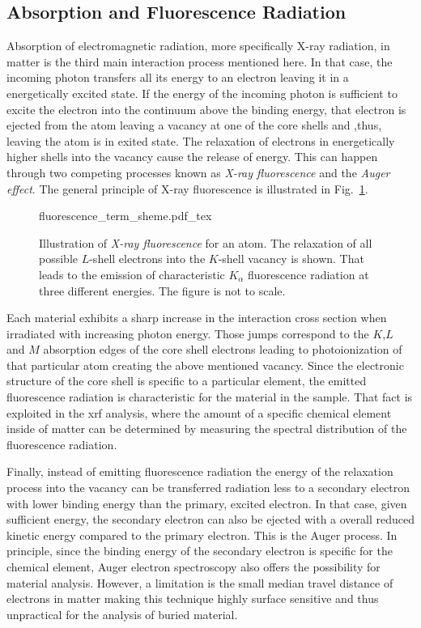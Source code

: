 \subsection{Absorption and Fluorescence Radiation} \label{ch_theo:sec_absorption_and_fluorescence}
Absorption of electromagnetic radiation, more specifically X-ray radiation, in matter is the third main interaction process mentioned here. In that case, the incoming photon transfers all its energy to an electron leaving it in a energetically excited state. If the energy of the incoming photon is sufficient to excite the electron into the continuum above the binding energy, that electron is ejected from the atom leaving a vacancy at one of the core shells and ,thus, leaving the atom is in exited state. The relaxation of electrons in energetically higher shells into the vacancy cause the release of energy. This can happen through two competing processes known as \emph{X-ray fluorescence} and the \emph{Auger effect}. The general principle of X-ray fluorescence is illustrated in Fig.~\ref{ch_theo:fig_fluorescence_term_sheme}.
\begin{figure}[htb]
    \def\svgwidth{0.5\textwidth}
    {fluorescence_term_sheme.pdf_tex}
    \caption[Illustration of \emph{X-ray fluorescence} for an atom.]{Illustration of \emph{X-ray fluorescence} for an atom. The relaxation of all possible $L$-shell electrons into the $K$-shell vacancy is shown. That leads to the emission of characteristic $K_\alpha$ fluorescence radiation at three different energies. The figure is not to scale.}
    \label{ch_theo:fig_fluorescence_term_sheme}
\end{figure}

Each material exhibits a sharp increase in the interaction cross section when irradiated with increasing photon energy. Those jumps correspond to the $K$,$L$ and $M$ absorption edges of the core shell electrons leading to photoionization of that particular atom creating the above mentioned vacancy. Since the electronic structure of the core shell is specific to a particular element, the emitted fluorescence radiation is characteristic for the material in the sample. That fact is exploited in the \gls{xrf} analysis, where the amount of a specific chemical element inside of matter can be determined by measuring the spectral distribution of the fluorescence radiation.

Finally, instead of emitting fluorescence radiation the energy of the relaxation process into the vacancy can be transferred radiation less to a secondary electron with lower binding energy than the primary, excited electron. In that case, given sufficient energy, the secondary electron can also be ejected with a overall reduced kinetic energy compared to the primary electron. This is the Auger process. In principle, since the binding energy of the secondary electron is specific for the chemical element, Auger electron spectroscopy also offers the possibility for material analysis. However, a limitation is the small median travel distance of electrons in matter making this technique highly surface sensitive and thus unpractical for the analysis of buried material.

